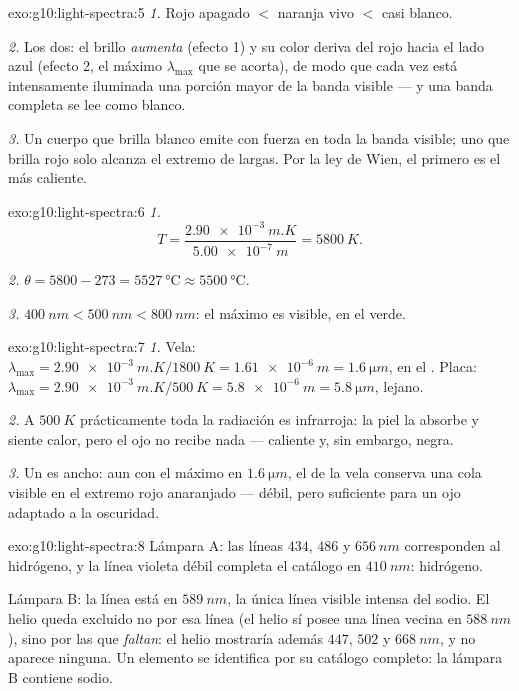 \begin{solution}{exo:g10:light-spectra:5}
\emph{1.} Rojo apagado $<$ naranja vivo $<$ casi blanco.

\emph{2.} Los dos: el brillo \emph{aumenta} (efecto 1) y su color
deriva del rojo hacia el lado azul (efecto 2, el máximo $\lambda_{\max}$
que se acorta), de modo que cada vez está intensamente iluminada una
porción mayor de la banda visible --- y una banda completa se lee como
blanco.

\emph{3.} Un cuerpo que brilla blanco emite con fuerza en toda la banda
visible; uno que brilla rojo solo alcanza el extremo de  largas. Por la ley de Wien, el primero es el más caliente.
\end{solution}

\begin{solution}{exo:g10:light-spectra:6}
\emph{1.}
\[
T = \frac{\qty{2.90e-3}{m.K}}{\qty{5.00e-7}{m}} = \qty{5800}{K}.
\]

\emph{2.} $\theta = 5800 - 273 = \qty{5527}{\degreeCelsius} \approx
\qty{5500}{\degreeCelsius}$.

\emph{3.} $\qty{400}{nm} < \qty{500}{nm} < \qty{800}{nm}$: el máximo es
visible, en el verde.
\end{solution}

\begin{solution}{exo:g10:light-spectra:7}
\emph{1.} Vela:
$\lambda_{\max} = \qty{2.90e-3}{m.K} / \qty{1800}{K} = \qty{1.61e-6}{m}
= \qty{1.6}{\micro m}$, en el . Placa:
$\lambda_{\max} = \qty{2.90e-3}{m.K} / \qty{500}{K} = \qty{5.8e-6}{m}
= \qty{5.8}{\micro m}$,  lejano.

\emph{2.} A $\qty{500}{K}$ prácticamente toda la radiación es
infrarroja: la piel la absorbe y siente calor, pero el ojo no recibe
nada --- caliente y, sin embargo, negra.

\emph{3.} Un  es ancho: aun con el máximo en
$\qty{1.6}{\micro m}$, el  de la vela conserva una cola visible
en el extremo rojo anaranjado --- débil, pero suficiente para un ojo
adaptado a la oscuridad.
\end{solution}

\begin{solution}{exo:g10:light-spectra:8}
Lámpara A: las líneas $434$, $486$ y $\qty{656}{nm}$ corresponden al
hidrógeno, y la línea violeta débil completa el catálogo en
$\qty{410}{nm}$: hidrógeno.

Lámpara B: la línea está en $\qty{589}{nm}$, la única línea visible
intensa del sodio. El helio queda excluido no por esa línea (el helio sí
posee una línea vecina en $\qty{588}{nm}$), sino por las que
\emph{faltan}: el helio mostraría además $447$, $502$ y $\qty{668}{nm}$,
y no aparece ninguna. Un elemento se identifica por su catálogo
completo: la lámpara B contiene sodio.
\end{solution}

